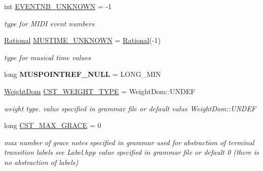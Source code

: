 \begin{DoxyCompactItemize}
\item 
\mbox{\label{group__general_gac3b19762b16f33de03662fd4289fe5a9}} 
int \mbox{\hyperlink{group__general_gac3b19762b16f33de03662fd4289fe5a9}{E\+V\+E\+N\+T\+N\+B\+\_\+\+U\+N\+K\+N\+O\+WN}} = -\/1
\begin{DoxyCompactList}\small\item\em type for M\+I\+DI event numbers \end{DoxyCompactList}\item 
\mbox{\label{group__general_gae862a9d955eb3154601efb64980ac24b}} 
\mbox{\hyperlink{classRational}{Rational}} \mbox{\hyperlink{group__general_gae862a9d955eb3154601efb64980ac24b}{M\+U\+S\+T\+I\+M\+E\+\_\+\+U\+N\+K\+N\+O\+WN}} = \mbox{\hyperlink{classRational}{Rational}}(-\/1)
\begin{DoxyCompactList}\small\item\em type for musical time values \end{DoxyCompactList}\item 
\mbox{\label{group__general_gab5f3e741743d1273f9b9219e7f3c6845}} 
long {\bfseries M\+U\+S\+P\+O\+I\+N\+T\+R\+E\+F\+\_\+\+N\+U\+LL} = L\+O\+N\+G\+\_\+\+M\+IN
\item 
\mbox{\label{group__general_ga5fbff41194dc7e48cea03604b5d7a060}} 
\mbox{\hyperlink{group__general_gae07bdce6f4896785ead3b815ca6ab560}{Weight\+Dom}} \mbox{\hyperlink{group__general_ga5fbff41194dc7e48cea03604b5d7a060}{C\+S\+T\+\_\+\+W\+E\+I\+G\+H\+T\+\_\+\+T\+Y\+PE}} = Weight\+Dom\+::\+U\+N\+D\+EF
\begin{DoxyCompactList}\small\item\em weight type. value specified in grammar file or default value Weight\+Dom\+::\+U\+N\+D\+EF \end{DoxyCompactList}\item 
\mbox{\label{group__general_ga942f8553c6b44bf0ed10f6c167794e89}} 
long \mbox{\hyperlink{group__general_ga942f8553c6b44bf0ed10f6c167794e89}{C\+S\+T\+\_\+\+M\+A\+X\+\_\+\+G\+R\+A\+CE}} = 0
\begin{DoxyCompactList}\small\item\em max number of grace notes specified in grammar used for abstraction of terminal transition labels see Label.\+hpp value specified in grammar file or default 0 (there is no abstraction of labels) \end{DoxyCompactList}\item 

\end{DoxyCompactItemize}
